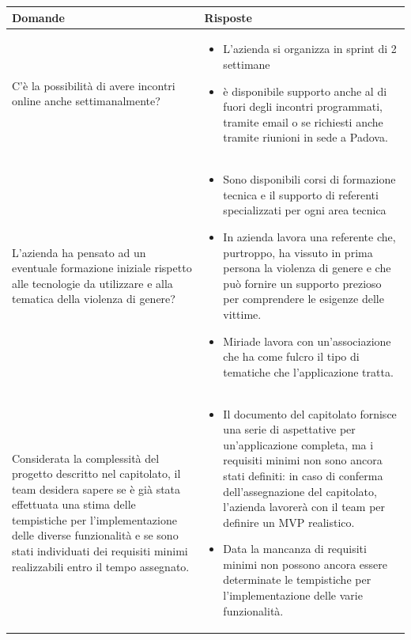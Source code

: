 \documentclass[a4paper,11pt]{article}
\begin{document}
{\footnotesize
\begin{tabularx}{\textwidth}{|>{\raggedright\arraybackslash}X|>{\raggedright\arraybackslash}X|}
\hline
\textbf{Domande} & \textbf{Risposte} \\
\hline
C'è la possibilità di avere incontri online anche settimanalmente?
&
\begin{itemize}
 \item L'azienda si organizza in sprint di 2 settimane
 \item è disponibile supporto anche al di fuori degli incontri programmati, tramite email o se richiesti anche tramite riunioni in sede a Padova.
\end{itemize}
\\
\hline
L'azienda ha pensato ad un eventuale formazione iniziale rispetto alle tecnologie da utilizzare e alla tematica della violenza di genere?
&
\begin{itemize}
 \item Sono disponibili corsi di formazione tecnica e il supporto di referenti specializzati per ogni area tecnica
 \item In azienda lavora una referente che, purtroppo, ha vissuto in prima persona la violenza di genere e che può fornire un supporto prezioso per comprendere le esigenze delle vittime.
 \item Miriade lavora con un'associazione che ha come fulcro il tipo di tematiche che l'applicazione tratta. 
\end{itemize}\\
\hline
Considerata la complessità del progetto descritto nel capitolato, il team desidera sapere se è già stata effettuata una stima delle tempistiche per l'implementazione delle diverse funzionalità e se sono stati individuati dei requisiti minimi realizzabili entro il tempo assegnato.
&
\begin{itemize}
 \item Il documento del capitolato fornisce una serie di aspettative per un'applicazione completa, ma i requisiti minimi non sono ancora stati definiti: in caso di conferma dell'assegnazione del capitolato, l'azienda lavorerà con il team per definire un MVP realistico.
 \item Data la mancanza di requisiti minimi non possono ancora essere determinate le tempistiche per l'implementazione delle varie funzionalità.
\end{itemize}\\
\hline
\end{tabularx}
} 
\end{document}
